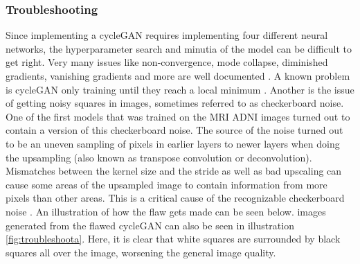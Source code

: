 \documentclass[12pt, fleqn, titlepage]{article}
\begin{document}
\subsubsection{Troubleshooting}\label{troubleshooting}
Since implementing a cycleGAN requires implementing four different neural networks, the hyperparameter search and minutia of the model can be difficult to get right. Very many issues like non-convergence, mode collapse, diminished gradients, vanishing gradients and more are well documented \cite{hard_to_train}. A known problem is cycleGAN only training until they reach a local minimum \cite{ganlocalminimum}. Another is the issue of getting noisy squares in images, sometimes referred to as checkerboard noise. One of the first models that was trained on the MRI ADNI images turned out to contain a version of this checkerboard noise. The source of the noise turned out to be an uneven sampling of pixels in earlier layers to newer layers when doing the upsampling (also known as transpose convolution or deconvolution). Mismatches between the kernel size and the stride as well as bad upscaling can cause some areas of the upsampled image to contain information from more pixels than other areas. This is a critical cause of the recognizable checkerboard noise \cite{checkerboard}. An illustration of how the flaw gets made can be seen below. images generated from the flawed cycleGAN can also be seen in illustration \ref{fig:troubleshoota}. Here, it is clear that white squares are surrounded by black squares all over the image, worsening the general image quality.
\end{document}
